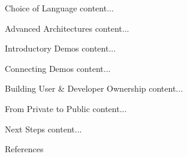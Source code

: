 \documentclass[11pt,compress,xcolor={usenames,dvipsnames},aspectratio=169]{beamer}
\begin{document}
\begin{frame}{Choice of Language}
	content...
\end{frame}

\begin{frame}{Advanced Architectures}
	content...
\end{frame}

\begin{frame}{Introductory Demos}
	content...
\end{frame}

\begin{frame}{Connecting Demos}
	content...
\end{frame}

\begin{frame}{Building User \& Developer Ownership}
	content...
\end{frame}

\begin{frame}{From Private to Public}
	content...
\end{frame}

\begin{frame}{Next Steps}
	content...
\end{frame}

\begin{frame}[allowframebreaks]{References}
	\printbibliography
\end{frame}
\end{document}
